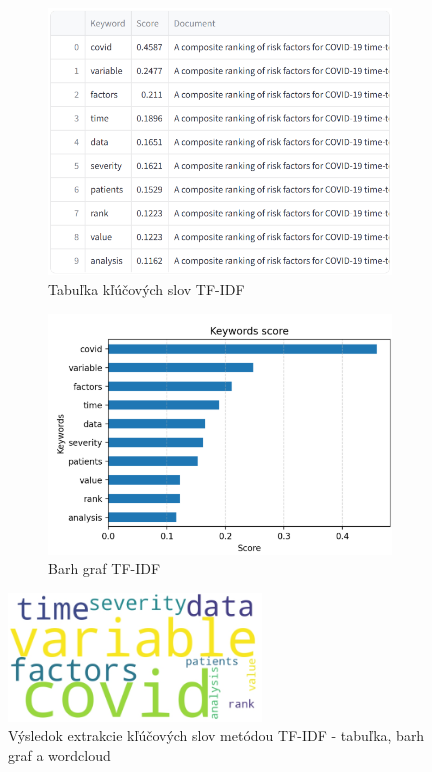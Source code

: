 \documentclass[a4paper,12pt]{article}
\begin{document}
\begin{figure}[htbp]
    \centering
    \begin{subfigure}[b]{0.45\textwidth}
        \includegraphics[width=\textwidth]{../images/tfidf_table.png}
        \caption{Tabuľka kľúčových slov TF-IDF}
        \label{fig:tfidf_table}
    \end{subfigure}
    \hfill
    \begin{subfigure}[b]{0.45\textwidth}
        \includegraphics[width=\textwidth]{../images/tfidf_barh.png}
        \caption{Barh graf TF-IDF}
        \label{fig:tfidf_barh}
    \end{subfigure}

    \vspace{0.5cm}

    \includegraphics[width=0.6\textwidth]{../images/tfidf_wordcloud.png}
    \caption{Výsledok extrakcie kľúčových slov metódou TF-IDF - tabuľka, barh graf a wordcloud}
    \label{fig:tfidf}
\end{figure}
\end{document}
